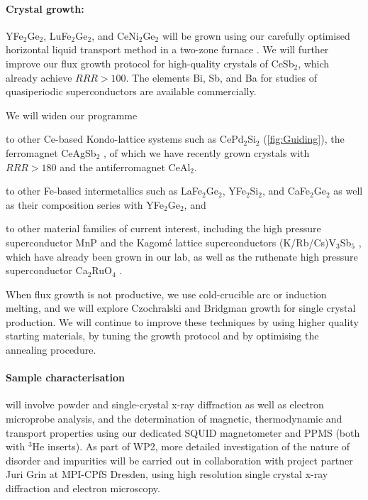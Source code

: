 \paragraph{Crystal growth:} YFe$_2$Ge$_2$, LuFe$_2$Ge$_2$, and CeNi$_2$Ge$_2$ will be grown using our carefully optimised horizontal liquid transport method  in a two-zone furnace .   We will further improve our flux growth protocol for high-quality crystals of CeSb$_2$, which already achieve $RRR>100$. The elements Bi, Sb, and Ba for studies of quasiperiodic superconductors are available commercially.

\vspace{0.5em}
\noindent 
We will widen our  programme
\begin{leftlist}
\item to other Ce-based Kondo-lattice systems such as CePd$_2$Si$_2$ (\autoref{fig:Guiding}), the ferromagnet CeAgSb$_2$ \cite{logg13}, of which we have recently grown crystals with $RRR>180$ and the antiferromagnet CeAl$_2$.
\item   to  other Fe-based intermetallics such as LaFe$_2$Ge$_2$, YFe$_2$Si$_2$, and CaFe$_2$Ge$_2$ as well
as their composition series with YFe$_2$Ge$_2$, and 
\item to 
 other material families of current interest, including the high pressure superconductor MnP \cite{cheng15} and the Kagom\'e lattice  superconductors (K/Rb/Cs)V$_3$Sb$_5$ \cite{ortiz21}, which have already been grown in our lab, as well as the ruthenate high pressure superconductor Ca$_2$RuO$_4$ \cite{alireza10}. %
\end{leftlist}
When flux growth is not productive, we use cold-crucible arc or %
induction melting, and we will
explore Czochralski and Bridgman growth for single crystal production. We will continue to improve these techniques by using higher quality starting materials, by tuning the growth protocol and by optimising the annealing procedure.  


\paragraph {Sample characterisation} will involve powder and
single-crystal x-ray diffraction as well as electron microprobe analysis,
and the determination of magnetic, thermodynamic and transport
properties using our dedicated
SQUID magnetometer and PPMS (both with $^3$He inserts).  
As part of WP2, more detailed investigation of the nature of disorder and impurities will be carried out in collaboration with project partner Juri Grin  at MPI-CPfS Dresden, using high resolution single crystal x-ray diffraction and electron microscopy.


